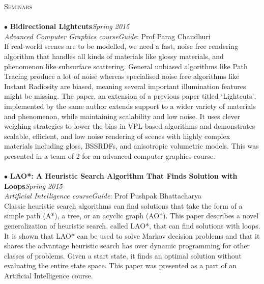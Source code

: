 \documentclass[a4paper,9pt]{article}
\begin{document}
\textcolor{myrust}{\large{\textsc{Seminars}}}\textcolor{mygray}{\sout{\hfill}}\\\\
\small %
$\bullet$ \textbf{Bidirectional Lightcuts}\hfill\textit{Spring 2015}\\
\textcolor{mydarkgray}{\textit{Advanced Computer Graphics course}}\hfill\textit{Guide}: \textcolor{mydarkgray}{Prof Parag Chaudhuri}\\
If real-world scenes are to be modelled, we need a fast, noise free rendering algorithm that handles all kinds of materials like glossy materials, and phenomenon like subsurface scattering. General unbiased algorithms like Path Tracing produce a lot of noise whereas specialised noise free algorithms like Instant Radiosity are biased, meaning several important illumination features might be missing. The paper, an extension of a previous paper titled `Lightcuts', implemented by the same author extends support to a wider variety of materials and phenomenon, while maintaining scalability and low noise. It uses clever weighing strategies to lower the bias in VPL-based algorithms and demonstrates scalable, efficient, and low noise rendering of scenes with highly complex materials including gloss, BSSRDFs, and anisotropic volumetric models. This was presented in a team of 2 for an advanced computer graphics course.\\\\
$\bullet$ \textbf{LAO*: A Heuristic Search Algorithm That Finds Solution with Loops}\hfill\textit{Spring 2015}\\
\textcolor{mydarkgray}{\textit{Artificial Intelligence course}}\hfill\textit{Guide}: \textcolor{mydarkgray}{Prof Pushpak Bhattacharya}\\
Classic heuristic search algorithms can find solutions that take the form of a simple path (A*), a tree, or an acyclic graph (AO*). This paper describes a novel generalization of heuristic search, called LAO*, that can find solutions with loops. It is shown that LAO* can be used to solve Markov decision problems and that it shares the advantage heuristic search has over dynamic programming for other classes of problems. Given a start state, it finds an optimal solution without evaluating the entire state space. This paper was presented as a part of an Artificial Intelligence course.\\\\
\end{document}
